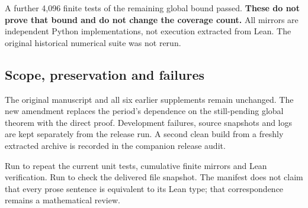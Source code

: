 A further 4,096 finite tests of the remaining global bound passed. \textbf{These do not prove that bound and do not change the coverage count.} All mirrors are independent Python implementations, not execution extracted from Lean. The original historical numerical suite was not rerun.

\subsection*{Scope, preservation and failures}
The original manuscript and all six earlier supplements remain unchanged. The new amendment replaces the period's dependence on the still-pending global theorem with the direct proof. Development failures, source snapshots and logs are kept separately from the release run. A second clean build from a freshly extracted archive is recorded in the companion release audit.

Run  to repeat the current unit tests, cumulative finite mirrors and Lean verification. Run  to check the delivered file snapshot. The manifest does not claim that every prose sentence is equivalent to its Lean type; that correspondence remains a mathematical review.
